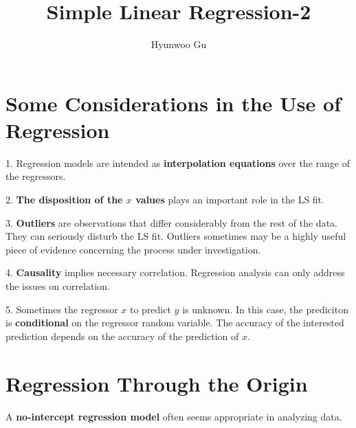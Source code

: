 \documentclass[12pt]{article}
\begin{document}
\title{\textbf{Simple Linear Regression-2}}
\author{Hyunwoo Gu}
\date{}

\maketitle


\setcounter{section}{8}
\section{Some Considerations in the Use of Regression}

1. Regression models are intended as \textbf{interpolation equations} over the range of the regressors.

\bigskip
\bigskip

2. \textbf{The disposition of the $x$ values} plays an important role in the LS fit. 

\bigskip
\bigskip

3. \textbf{Outliers} are observations that differ considerably from the rest of the data. They can seriously disturb the LS fit. Outliers sometimes may be a highly useful piece of evidence concerning the process under investigation. 

\bigskip
\bigskip

4. \textbf{Causality} implies necessary correlation. Regression analysis can only address the issues on correlation. 

\bigskip
\bigskip

5. Sometimes the regressor $x$ to predict $y$ is unknown. In this case, the prediciton is \textbf{conditional} on the regressor random variable. The accuracy of the interested prediction depends on the accuracy of the prediction of $x$.

\bigskip
\bigskip



\pagebreak
\section{Regression Through the Origin}

A \textbf{no-intercept regression model} often seems appropriate in analyzing data. 
\end{document}
